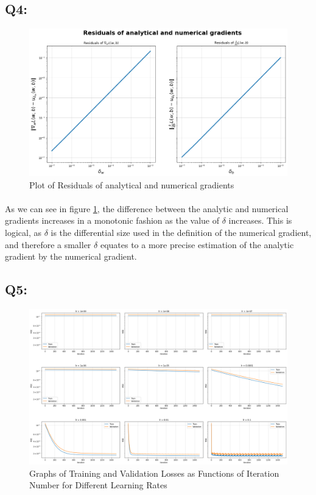 \documentclass{article}
\begin{document}
\subsection*{Q4:}
    \begin{figure}[H]
        \centering
        \includegraphics[scale=0.48]{q4.png}
        \caption{Plot of Residuals of analytical and numerical gradients}
        \label{fig:q4}
    \end{figure}
    \paragraph*{}
    As we can see in figure \ref{fig:q4}, the difference between the analytic and numerical gradients increases in a  monotonic fashion as the value of $\delta$ increases. This is logical, as $\delta$ is the differential size used in the definition of the numerical gradient, and therefore a smaller $\delta$  equates to a more precise estimation of the analytic gradient by the numerical gradient.
\subsection*{Q5:}
    \begin{figure}[H]
        \centering
        \includegraphics[scale=0.35]{q5.png}
        \caption{Graphs of Training and Validation Losses as Functions of Iteration Number for Different  Learning Rates}
        \label{fig:q5}
    \end{figure}
\end{document}
